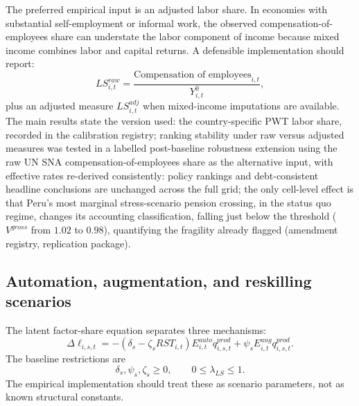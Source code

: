 \documentclass[11pt,a4paper]{article}
\begin{document}
The preferred empirical input is an adjusted labor share. In economies with substantial self-employment or informal work, the observed compensation-of-employees share can understate the labor component of income because mixed income combines labor and capital returns. A defensible implementation should report:
\begin{equation}
    LS^{raw}_{i,t}=\frac{\text{Compensation of employees}_{i,t}}{Y^0_{i,t}},
\end{equation}
plus an adjusted measure $LS^{adj}_{i,t}$ when mixed-income imputations are available. The main results state the version used: the country-specific PWT labor share, recorded in the calibration registry; ranking stability under raw versus adjusted measures was tested in a labelled post-baseline robustness extension using the raw UN SNA compensation-of-employees share as the alternative input, with effective rates re-derived consistently: policy rankings and debt-consistent headline conclusions are unchanged across the full grid; the only cell-level effect is that Peru's most marginal stress-scenario pension crossing, in the status quo regime, changes its accounting classification, falling just below the threshold ($V^{gross}$ from $1.02$ to $0.98$), quantifying the fragility already flagged (amendment registry, replication package).

\subsection{Automation, augmentation, and reskilling scenarios}

The latent factor-share equation separates three mechanisms:
\begin{equation}
    \Delta \ell_{i,s,t}
    =
    -\left(\delta_s-\zeta_s RST_{i,t}\right)E^{auto}_{i,t}q^{prod}_{i,s,t}
    +\psi_s E^{aug}_{i,t}q^{prod}_{i,s,t}.
\end{equation}
The baseline restrictions are
\begin{equation}
    \delta_s,\psi_s,\zeta_s\geq0,
    \qquad
    0\leq \lambda_{LS}\leq1.
\end{equation}
The empirical implementation should treat these as scenario parameters, not as known structural constants.
\end{document}
